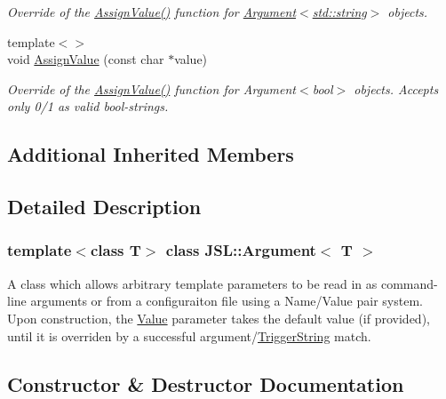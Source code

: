 \begin{DoxyCompactItemize}
\begin{DoxyCompactList}\small\item\em Override of the \hyperlink{classJSL_1_1Argument_ac77530598054943c996dbb5fb677b844}{Assign\+Value()} function for \hyperlink{classJSL_1_1Argument_ab438509a3c030516de72f3f493295bd5}{Argument$<$std\+::string$>$} objects. \end{DoxyCompactList}\item 
{\footnotesize template$<$$>$ }\\void \hyperlink{classJSL_1_1Argument_a0831822da0a2da47daa07d2e51b87d2a}{Assign\+Value} (const char $\ast$value)
\begin{DoxyCompactList}\small\item\em Override of the \hyperlink{classJSL_1_1Argument_ac77530598054943c996dbb5fb677b844}{Assign\+Value()} function for Argument$<$bool$>$ objects. Accepts only 0/1 as valid bool-\/strings. \end{DoxyCompactList}\end{DoxyCompactItemize}
\subsection*{Additional Inherited Members}


\subsection{Detailed Description}
\subsubsection*{template$<$class T$>$\newline
class J\+S\+L\+::\+Argument$<$ T $>$}

A class which allows arbitrary template parameters to be read in as command-\/line arguments or from a configuraiton file using a Name/\+Value pair system. Upon construction, the \hyperlink{classJSL_1_1Argument_a83ada5bfa412192f76dd4290f679defd}{Value} parameter takes the default value (if provided), until it is overriden by a successful argument/\hyperlink{classJSL_1_1ArgumentInterface_afa2d1f96c4971070d3de5824f297312f}{Trigger\+String} match. 

\subsection{Constructor \& Destructor Documentation}
\mbox{\label{classJSL_1_1Argument_ab438509a3c030516de72f3f493295bd5}} 
